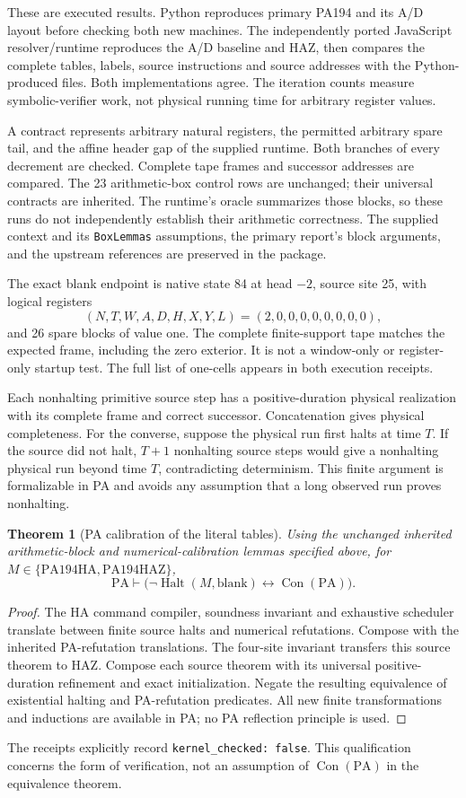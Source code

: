 \documentclass[11pt]{article}
\newtheorem{theorem}{Theorem}[section]
\newcommand{\PA}{\mathrm{PA}}
\newcommand{\Con}{\operatorname{Con}}
\newcommand{\Halt}{\operatorname{Halt}}
\begin{document}
These are executed results. Python reproduces primary PA194 and its A/D
layout before checking both new machines. The independently ported
JavaScript resolver/runtime reproduces the A/D baseline and HAZ, then
compares the complete tables, labels, source instructions and source
addresses with the Python-produced files. Both implementations agree.
The iteration counts measure symbolic-verifier work, not physical running
time for arbitrary register values.

A contract represents arbitrary natural registers, the permitted arbitrary
spare tail, and the affine header gap of the supplied runtime. Both
branches of every decrement are checked. Complete tape frames and successor
addresses are compared. The 23 arithmetic-box control rows are unchanged;
their universal contracts are inherited. The runtime's oracle summarizes
those blocks, so these runs do not independently establish their arithmetic
correctness. The supplied  context and its
\texttt{BoxLemmas} assumptions, the primary report's block arguments, and
the upstream references are preserved in the package.

The exact blank endpoint is native state 84 at head $-2$, source site 25,
with logical registers
\[
 (N,T,W,A,D,H,X,Y,L)=(2,0,0,0,0,0,0,0,0),
\]
and 26 spare blocks of value one. The complete finite-support tape matches
the expected frame, including the zero exterior. It is not a window-only
or register-only startup test. The full list of one-cells appears in both
execution receipts.

Each nonhalting primitive source step has a positive-duration physical
realization with its complete frame and correct successor. Concatenation
gives physical completeness. For the converse, suppose the physical run
first halts at time $T$. If the source did not halt, $T+1$ nonhalting source
steps would give a nonhalting physical run beyond time $T$, contradicting
determinism. This finite argument is formalizable in PA and avoids any
assumption that a long observed run proves nonhalting.

\begin{theorem}[PA calibration of the literal tables]
Using the unchanged inherited arithmetic-block and numerical-calibration
lemmas specified above, for $M\in\{\mathrm{PA194HA},\mathrm{PA194HAZ}\}$,
\[
 \boxed{\PA\vdash
       \bigl(\neg\Halt(M,\text{blank})\leftrightarrow\Con(\PA)\bigr).}
\]
\end{theorem}
\begin{proof}
The HA command compiler, soundness invariant and exhaustive scheduler
translate between finite source halts and numerical refutations. Compose
with the inherited PA-refutation translations. The four-site invariant
transfers this source theorem to HAZ. Compose each source theorem with
its universal positive-duration refinement and exact initialization.
Negate the resulting equivalence of existential halting and PA-refutation
predicates. All new finite transformations and inductions are available
in PA; no PA reflection principle is used.
\end{proof}
The receipts explicitly record \texttt{kernel\_checked: false}. This
qualification concerns the form of verification, not an assumption of
$\Con(\PA)$ in the equivalence theorem.
\end{document}
